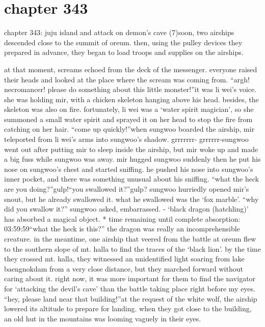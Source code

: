 \section{chapter 343}

chapter 343: juju island and attack on demon’s cave (7)soon, two airships descended close to the summit of oreum.
 then, using the pulley devices they prepared in advance, they began to load troops and supplies on the airships.





at that moment, screams echoed from the deck of the messenger.
everyone raised their heads and looked at the place where the scream was coming from.
“argh! necromancer! please do something about this little monster!”it was li wei’s voice.
 she was holding mir, with a chicken skeleton hanging above his head.
besides, the skeleton was also on fire.
 fortunately, li wei was a ‘water spirit magician’, so she summoned a small water spirit and sprayed it on her head to stop the fire from catching on her hair.
“come up quickly!”when sungwoo boarded the airship, mir teleported from li wei’s arms into sungwoo’s shadow.
grrrrrrr- grrrrrr-sungwoo went out after putting mir to sleep inside the airship, but mir woke up and made a big fuss while sungwoo was away.
mir hugged sungwoo suddenly then he put his nose on sungwoo’s chest and started sniffing.
he pushed his nose into sungwoo’s inner pocket, and there was something unusual about his sniffing.
“what the heck are you doing?”gulp!“you swallowed it?”gulp? sungwoo hurriedly opened mir’s snout, but he already swallowed it.
 what he swallowed was the ‘fox marble’.
“why did you swallow it?” sungwoo asked, embarrassed.
- ‘black dragon (hatchling)’ has absorbed a magical object.
* time remaining until complete absorption: 03:59:59“what the heck is this?”
the dragon was really an incomprehensible creature.
in the meantime, one airship that veered from the battle at oreum flew to the southern slope of mt.
 halla to find the traces of the ‘black lion’.
by the time they crossed mt.
 halla, they witnessed an unidentified light soaring from lake baengnokdam from a very close distance, but they marched forward without caring about it.
right now, it was more important for them to find the navigator for ‘attacking the devil’s cave’ than the battle taking place right before my eyes.
“hey, please land near that building!”at the request of the white wolf, the airship lowered its altitude to prepare for landing.
 when they got close to the building, an old hut in the mountains was looming vaguely in their eyes.
